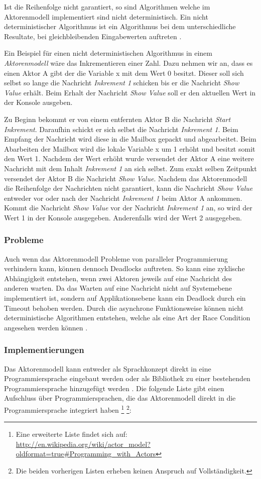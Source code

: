 Ist die Reihenfolge nicht garantiert, so sind Algorithmen welche im Aktorenmodell implementiert sind nicht deterministisch. Ein nicht deterministischer Algorithmus ist ein Algorithmus bei dem unterschiedliche Resultate, bei gleichbleibenden Eingabewerten auftreten \cite[]{Agh85}. 

Ein Beispiel für einen nicht deterministischen Algorithmus in einem \emph{Aktorenmodell} wäre das Inkrementieren einer Zahl. Dazu nehmen wir an, dass es einen Aktor A gibt der die Variable x mit dem Wert 0 besitzt. Dieser soll sich selbst so lange die Nachricht \emph{Inkrement 1} schicken bis er die Nachricht \emph{Show Value} erhält. Beim Erhalt der Nachricht \emph{Show Value} soll er den aktuellen Wert in der Konsole ausgeben.

Zu Beginn bekommt er von einem entfernten Aktor B die Nachricht \emph{Start Inkrement}. Daraufhin schickt er sich selbst die Nachricht \emph{Inkrement 1}. Beim Empfang der Nachricht wird diese in die Mailbox gepackt und abgearbeitet. Beim Abarbeiten der Mailbox wird die lokale Variable x um 1 erhöht und besitzt somit den Wert 1. Nachdem der Wert erhöht wurde versendet der Aktor A eine weitere Nachricht mit dem Inhalt \emph{Inkrement 1} an sich selbst. Zum exakt selben Zeitpunkt versendet der Aktor B die Nachricht \emph{Show Value}. Nachdem das Aktorenmodell die Reihenfolge der Nachrichten nicht garantiert, kann die Nachricht \emph{Show Value} entweder vor oder nach der Nachricht \emph{Inkrement 1} beim Aktor A ankommen. Kommt die Nachricht \emph{Show Value} vor der Nachricht \emph{Inkrement 1} an, so wird der Wert 1 in der Konsole ausgegeben. Anderenfalls wird der Wert 2 ausgegeben.

\subsubsection{Probleme}
Auch wenn das Aktorenmodell Probleme von paralleler Programmierung verhindern kann, können dennoch Deadlocks auftreten. So kann eine zyklische Abhängigkeit entstehen, wenn zwei Aktoren jeweils auf eine Nachricht des anderen warten. Da das Warten auf eine Nachricht nicht auf Systemebene implementiert ist, sondern auf Applikationsebene kann ein Deadlock durch ein Timeout behoben werden. Durch die asynchrone Funktionsweise können nicht deterministische Algorithmen entstehen, welche als eine Art der Race Condition angesehen werden können \cite[p. 86]{Erb2012}.

\subsubsection{Implementierungen}
Das Aktorenmodell kann entweder als Sprachkonzept direkt in eine Programmiersprache eingebaut werden oder als Bibliothek zu einer bestehenden Programmiersprache hinzugefügt werden  \cite[p. 86]{Erb2012}. Die folgende Liste gibt einen Aufschluss über Programmiersprachen, die das Aktorenmodell direkt in die Programmiersprache integriert haben \footnote{Eine erweiterte Liste findet sich auf: \url{http://en.wikipedia.org/wiki/actor_model?oldformat=true#Programming_with_Actors}} \footnote{Die beiden vorherigen Listen erheben keinen Anspruch auf Vollständigkeit.}:


